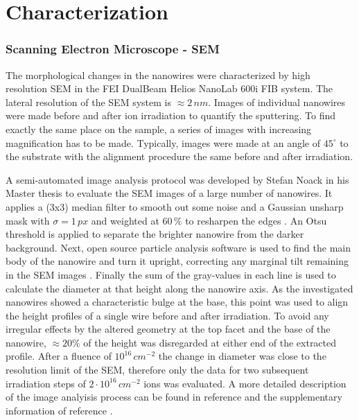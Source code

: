 \section{Characterization}

\subsubsection{Scanning Electron Microscope - SEM}

The morphological changes in the nanowires were characterized by high resolution SEM in the FEI DualBeam Helios NanoLab 600i FIB system. The lateral resolution of the SEM system is $\approx 2\,nm$. Images of individual nanowires were made before and after ion irradiation to quantify the sputtering. To find exactly the same place on the sample, a series of images with increasing magnification has to be made. Typically, images were made at an angle of $45^\circ$ to the substrate with the alignment procedure the same before and after irradiation.

A semi-automated image analysis protocol was developed by Stefan Noack in his Master thesis \cite{noack_sputter_2014, johannes_anomalous_2015} to evaluate the SEM images of a large number of nanowires. It applies a (3x3) median filter to smooth out some noise and a Gaussian unsharp mask with $\sigma = 1\,px$ and weighted at $60\,\%$ to resharpen the edges \cite{sankur_survey_2004}. An Otsu threshold \cite{otsu_threshold_1979} is applied to separate the brighter nanowire from the darker background. Next, open source particle analysis software is used to find the main body of the nanowire and turn it upright, correcting any marginal tilt remaining in the SEM images \cite{schindelin_fiji:_2012,sage_imagej_2012}. Finally the sum of the gray-values in each line is used to calculate the diameter at that height along the nanowire axis. As the investigated nanowires showed a characteristic bulge at the base, this point was used to align the height profiles of a single wire before and after irradiation. To avoid any irregular effects by the altered geometry at the top facet and the base of the nanowire, $\approx 20\%$ of the height was disregarded at either end of the extracted profile. After a fluence of $10^{16}\,cm^{-2}$ the change in diameter was close to the resolution limit of the SEM, therefore only the data for two subsequent irradiation steps of $2\cdot 10^{16}\,cm^{-2}$ ions was evaluated. A more detailed description of the image analyisis process can be found in reference \cite{noack_sputter_2014} and the supplementary information of reference \cite{johannes_anomalous_2015}.

